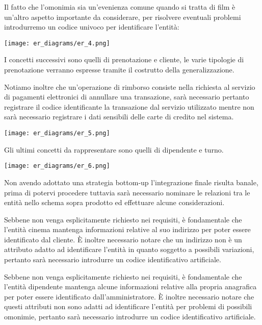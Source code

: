 Il fatto che l'omonimia sia un'evenienza comune quando si tratta di film
è un'altro aspetto importante da considerare, per risolvere eventuali problemi
introdurremo un codice univoco per identificare l'entità:

\begin{center}
    \texttt{[image: er\_diagrams/er\_4.png]}
\end{center}

\pagebreak

I concetti successivi sono quelli di prenotazione e cliente, le varie tipologie
di prenotazione verranno espresse tramite il costrutto della generalizzazione.

Notiamo inoltre che un'operazione di rimborso consiste nella richiesta al
servizio di pagamenti elettronici di annullare una transazione, sarà necessario
pertanto registrare il codice identificante la transazione dal servizio
utilizzato mentre non sarà necessario registrare i dati sensibili delle carte
di credito nel sistema.

\begin{center}
    \texttt{[image: er\_diagrams/er\_5.png]}
\end{center}

\pagebreak

Gli ultimi concetti da rappresentare sono quelli di dipendente e turno.

\texttt{[image: er\_diagrams/er\_6.png]}

Non avendo adottato una strategia bottom-up l'integrazione finale risulta
banale, prima di potervi procedere tuttavia sarà necessario nominare le
relazioni tra le entità nello schema sopra prodotto ed effettuare alcune
considerazioni.

Sebbene non venga esplicitamente richiesto nei requisiti, è fondamentale che
l'entità cinema mantenga informazioni relative al suo indirizzo per poter
essere identificato dal cliente.
È inoltre necessario notare che un indirizzo non è un attributo adatto ad
identificare l'entità in quanto soggetto a possibili variazioni, pertanto
sarà necessario introdurre un codice identificativo artificiale.

Sebbene non venga esplicitamente richiesto nei requisiti, è fondamentale che
l'entità dipendente mantenga alcune informazioni relative alla propria
anagrafica per poter essere identificato dall'amministratore.
È inoltre necessario notare che questi attributi non sono adatti ad
identificare l'entità per problemi di possibili omonimie, pertanto
sarà necessario introdurre un codice identificativo artificiale.

